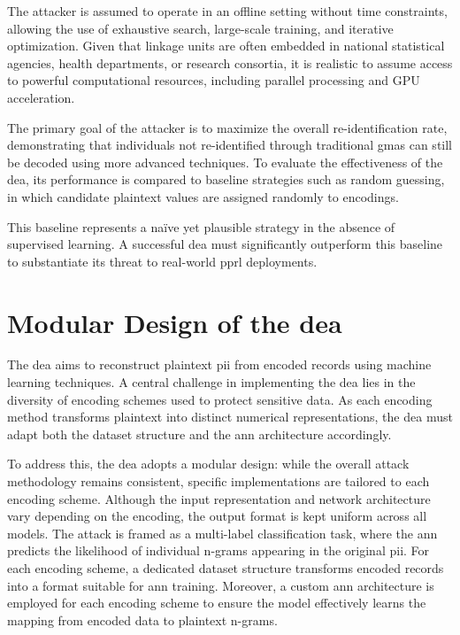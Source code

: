 The attacker is assumed to operate in an offline setting without time constraints, allowing the use of exhaustive search, large-scale training, and iterative optimization.
Given that linkage units are often embedded in national statistical agencies, health departments, or research consortia, it is realistic to assume access to powerful computational resources, including parallel processing and GPU acceleration.

The primary goal of the attacker is to maximize the overall re-identification rate, demonstrating that individuals not re-identified through traditional \ac{gma}s can still be decoded using more advanced techniques.
To evaluate the effectiveness of the \ac{dea}, its performance is compared to baseline strategies such as random guessing, in which candidate plaintext values are assigned randomly to encodings.

This baseline represents a naïve yet plausible strategy in the absence of supervised learning.
A successful \ac{dea} must significantly outperform this baseline to substantiate its threat to real-world \ac{pprl} deployments.

\section{Modular Design of the \ac{dea}} \label{sec:designandimplementation}

The \ac{dea} aims to reconstruct plaintext \ac{pii} from encoded records using machine learning techniques.
A central challenge in implementing the \ac{dea} lies in the diversity of encoding schemes used to protect sensitive data.
As each encoding method transforms plaintext into distinct numerical representations, the \ac{dea} must adapt both the dataset structure and the \ac{ann} architecture accordingly.

To address this, the \ac{dea} adopts a modular design: while the overall attack methodology remains consistent, specific implementations are tailored to each encoding scheme.
Although the input representation and network architecture vary depending on the encoding, the output format is kept uniform across all models.
The attack is framed as a multi-label classification task, where the \ac{ann} predicts the likelihood of individual n-grams appearing in the original \ac{pii}.
For each encoding scheme, a dedicated dataset structure transforms encoded records into a format suitable for \ac{ann} training.
Moreover, a custom \ac{ann} architecture is employed for each encoding scheme to ensure the model effectively learns the mapping from encoded data to plaintext n-grams.

